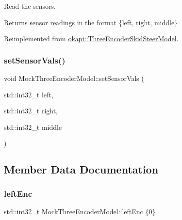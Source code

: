 Read the sensors. 

\begin{DoxyReturn}{Returns}
sensor readings in the format \{left, right, middle\} 
\end{DoxyReturn}


Reimplemented from \mbox{\hyperlink{classokapi_1_1ThreeEncoderSkidSteerModel_a39af35aa25e5385584b3834911aed341}{okapi\+::\+Three\+Encoder\+Skid\+Steer\+Model}}.

\mbox{\label{classMockThreeEncoderModel_a645e8b959fca1501920224882ed3e458}} 
\subsubsection{\texorpdfstring{setSensorVals()}{setSensorVals()}}
{\footnotesize\ttfamily void Mock\+Three\+Encoder\+Model\+::set\+Sensor\+Vals (\begin{DoxyParamCaption}\item[{std\+::int32\+\_\+t}]{left,  }\item[{std\+::int32\+\_\+t}]{right,  }\item[{std\+::int32\+\_\+t}]{middle }\end{DoxyParamCaption})\hspace{0.3cm}{\ttfamily [inline]}}



\subsection{Member Data Documentation}
\mbox{\label{classMockThreeEncoderModel_aba80c6ce08e472a9d1eb1f51000ba790}} 
\subsubsection{\texorpdfstring{leftEnc}{leftEnc}}
{\footnotesize\ttfamily std\+::int32\+\_\+t Mock\+Three\+Encoder\+Model\+::left\+Enc \{0\}}

\mbox{\label{classMockThreeEncoderModel_aecf199207e0dc4648047593271e6a2dd}} 
